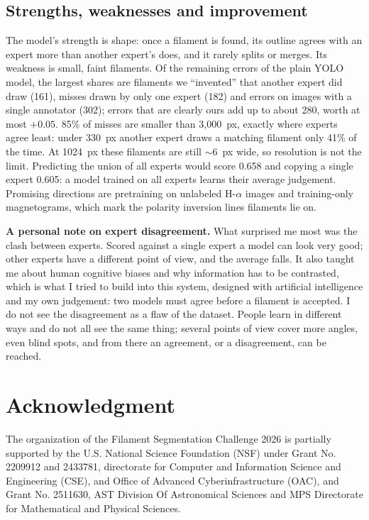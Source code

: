 \documentclass[sigconf]{acmart}
\begin{document}
\subsection{Strengths, weaknesses and improvement}
The model's strength is shape: once a filament is found, its outline agrees with an expert more than another expert's does, and it rarely splits or merges. Its weakness is small, faint filaments. Of the remaining errors of the plain YOLO model, the largest shares are filaments we ``invented'' that another expert did draw (161), misses drawn by only one expert (182) and errors on images with a single annotator (302); errors that are clearly ours add up to about 280, worth at most $+0.05$. 85\% of misses are smaller than 3{,}000~px, exactly where experts agree least: under 330~px another expert draws a matching filament only 41\% of the time. At 1024~px these filaments are still $\sim$6~px wide, so resolution is not the limit. Predicting the union of all experts would score 0.658 and copying a single expert 0.605: a model trained on all experts learns their average judgement. Promising directions are pretraining on unlabeled H-$\alpha$ images and training-only magnetograms, which mark the polarity inversion lines filaments lie on.

\textbf{A personal note on expert disagreement.} What surprised me most was the clash between experts. Scored against a single expert a model can look very good; other experts have a different point of view, and the average falls. It also taught me about human cognitive biases and why information has to be contrasted, which is what I tried to build into this system, designed with artificial intelligence and my own judgement: two models must agree before a filament is accepted. I do not see the disagreement as a flaw of the dataset. People learn in different ways and do not all see the same thing; several points of view cover more angles, even blind spots, and from there an agreement, or a disagreement, can be reached.


\section{Acknowledgment}\label{sec:acknowledgment}
    The organization of the Filament Segmentation Challenge 2026 is partially supported by the U.S. National Science Foundation (NSF) under Grant No. 2209912 and 2433781, directorate for Computer and Information Science and Engineering (CSE), and Office of Advanced Cyberinfrastructure (OAC), and Grant No. 2511630, AST Division Of Astronomical Sciences and MPS Directorate for Mathematical and Physical Sciences.
\end{document}
